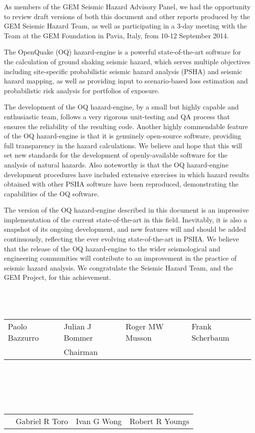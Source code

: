 As members of the GEM Seismic Hazard Advisory Panel, we had the opportunity to review draft versions of both this document and other reports produced by the GEM Seismic Hazard Team, as well as participating in a 3-day meeting with the Team at the GEM Foundation in Pavia, Italy, from 10-12 September 2014. 

The OpenQuake (OQ) hazard-engine is a powerful state-of-the-art software for the calculation of ground shaking seismic hazard, which serves multiple objectives including site-specific probabilistic seismic hazard analysis (PSHA) and seismic hazard mapping, as well as providing input to scenario-based loss estimation and probabilistic risk analysis for portfolios of exposure. 

The development of the OQ hazard-engine, by a small but highly capable and enthusiastic team, follows a very rigorous unit-testing and QA process that ensures the reliability of the resulting code. Another highly commendable feature of the OQ hazard-engine is that it is genuinely open-source software, providing full transparency in the hazard calculations.  We believe and hope that this will set new standards for the development of openly-available software for the analysis of natural hazards. Also noteworthy is that the OQ hazard-engine development procedures have included extensive exercises in which hazard results obtained with other PSHA software have been reproduced, demonstrating the capabilities of the OQ software. 

The version of the OQ hazard-engine described in this document is an impressive implementation of the current state-of-the-art in this field. Inevitably, it is also a snapshot of its ongoing development, and new features will and should be added continuously, reflecting the ever evolving state-of-the-art in PSHA. We believe that the release of the OQ hazard-engine to the wider seismological and engineering communities will contribute to an improvement in the practice of seismic hazard analysis. We congratulate the Seismic Hazard Team, and the GEM Project, for this achievement. 
\hfill \\
\hfill \\
\hfill \\
\hfill \\
\begin{tabular}{p{3.2cm}p{3.2cm}p{3.2cm}p{3.2cm}}
Paolo Bazzurro & Julian J Bommer& Roger MW Musson & Frank Scherbaum \\
			   & Chairman & & \\
\end{tabular}
\hfill \\
\hfill \\
\hfill \\
\hfill \\
\begin{tabular}{p{1.5cm}p{3cm}p{3cm}p{3cm}}
& Gabriel R Toro & Ivan G Wong & Robert R Youngs \\
\end{tabular}
